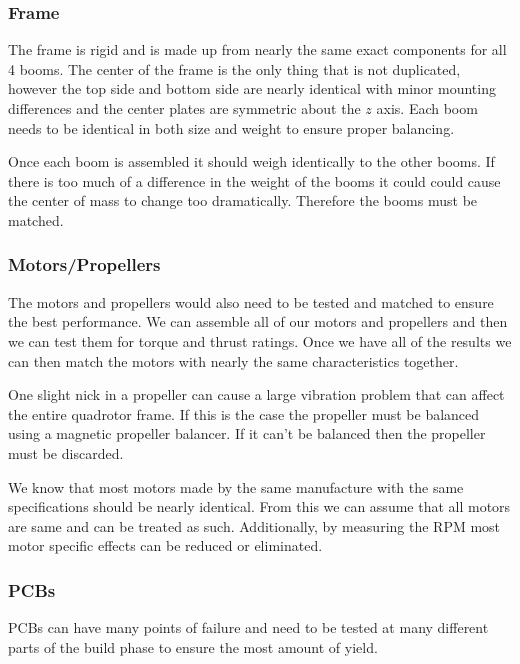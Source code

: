 \documentclass{article}
\numberwithin{equation}{section} %
\begin{document}
\subsubsection{Frame}
The frame is rigid and is made up from nearly the same exact components for all 4 booms. The center of the frame is the only thing that is not duplicated, however the top side and bottom side are nearly identical with minor mounting differences and the center plates are symmetric about the $z$ axis. Each boom needs to be identical in both size and weight to ensure proper balancing.

Once each boom is assembled it should weigh identically to the other booms. If there is too much of a difference in the weight of the booms it could could cause the center of mass to change too dramatically. Therefore the booms must be matched.

\subsubsection{Motors/Propellers}
The motors and propellers would also need to be tested and matched to ensure the best performance. We can assemble all of our motors and propellers and then we can test them for torque and thrust ratings. Once we have all of the results we can then match the motors with nearly the same characteristics together.

One slight nick in a propeller can cause a large vibration problem that can affect the entire quadrotor frame. If this is the case the propeller must be balanced using a magnetic propeller balancer. If it can't be balanced then the propeller must be discarded.

We know that most motors made by the same manufacture with the same specifications should be nearly identical. From this we can assume that all motors are same and can be treated as such. Additionally, by measuring the RPM most motor specific effects can be reduced or eliminated.

\subsubsection{PCBs}
PCBs can have many points of failure and need to be tested at many different parts of the build phase to ensure the most amount of yield. 
\end{document}
